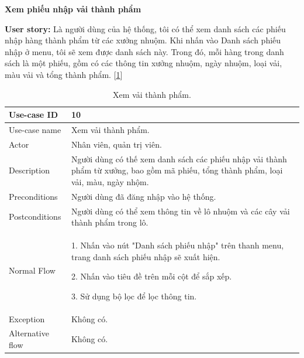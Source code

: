 \newpage
\textbf{Xem phiếu nhập vải thành phẩm}\par
\textbf{User story:} Là người dùng của hệ thống, tôi có thể xem danh sách các phiếu nhập hàng thành phẩm từ các xưởng nhuộm. Khi nhấn vào Danh sách phiếu nhập ở menu, tôi sẽ xem được danh sách này. Trong đó, mỗi hàng trong danh sách là một phiếu, gồm có các thông tin xưởng nhuộm, ngày nhuộm, loại vải, màu vải và tổng thành phẩm. [\ref{bang10}]
\begin{table}[!htp]
    \centering
    \begin{tabular}{|m{3cm}|m{10cm}|}
    \hline 
        Use-case ID & 10\\ \hline
        Use-case name & Xem vải thành phẩm.\\ \hline
        Actor & Nhân viên, quản trị viên.\\ \hline
        Description & Người dùng có thế xem danh sách các phiếu nhập vải thành phẩm từ xưởng, bao gồm mã phiếu, tổng thành phẩm, loại vải, màu, ngày nhộm.\\ \hline
        Preconditions & Người dùng đã đăng nhập vào hệ thống.\\ \hline
        Postconditions & Người dùng có thể xem thông tin về lô nhuộm và các cây vải thành phẩm trong lô.\\ \hline
        Normal Flow & 
        1. Nhấn vào nút "Danh sách phiếu nhập" trên thanh menu, trang danh sách phiếu nhập sẽ xuất hiện.\par
        2. Nhấn vào tiêu đề trên mỗi cột để sắp xếp.\par
        3. Sử dụng bộ lọc để lọc thông tin.
        \\ \hline
        Exception & Không có.\\ \hline
        Alternative flow & Không có.\\ 
    \hline 
    \end{tabular}
    \caption{Xem vải thành phẩm.}
    \label{bang10}
\end{table}

